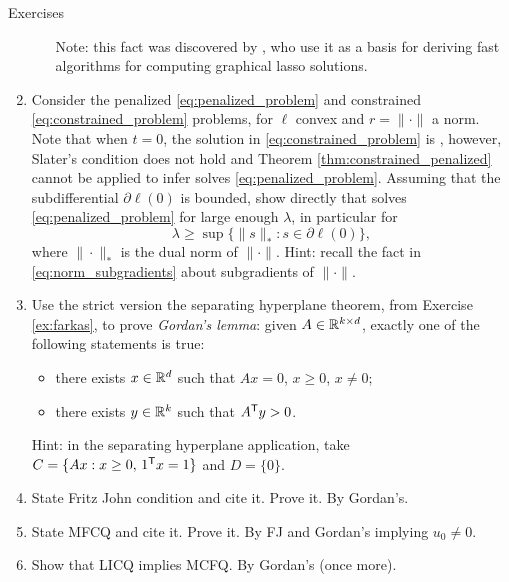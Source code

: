 \begin{xcb}{Exercises}
\begin{enumerate}[label=\thechapter.\arabic*]
\begin{enumerate}[label=\alph*.]
  \smallskip 
  Note: this fact was discovered by \cite{witten2011new, mazumder2012exact}, who
  use it as a basis for deriving fast algorithms for computing graphical lasso
  solutions.     
\end{enumerate}

\item \label{ex:penalized_limit}
  Consider the penalized \eqref{eq:penalized_problem} and constrained
  \eqref{eq:constrained_problem} problems, for $\ell$ convex and $r =
  \|\cdot\|$ a norm. Note that when $t = 0$, the solution in
  \eqref{eq:constrained_problem} is , however, Slater's
  condition does not hold and Theorem \ref{thm:constrained_penalized} cannot be
  applied to infer  solves
  \eqref{eq:penalized_problem}. Assuming that the subdifferential $\partial
  \ell(0)$ is bounded, show directly that  solves
  \eqref{eq:penalized_problem} for large enough $\lambda$, in particular for 
  \[
  \lambda \geq \sup \{ \|s\|_* : s \in \partial \ell(0) \},
  \]
  where $\|\cdot\|_*$ is the dual norm of $\|\cdot\|$. Hint: recall the fact in 
  \eqref{eq:norm_subgradients} about subgradients of $\|\cdot\|$.

\item \label{ex:gordan}
  Use the strict version the separating hyperplane theorem, from Exercise  
  \ref{ex:farkas}, to prove \emph{Gordan's lemma}: given $A \in \mathbb{R}^{k \times  
    d}$, exactly one of the following statements is true:  
  \begin{itemize}
  \item there exists $x \in \mathbb{R}^d$ such that $Ax=0$, $x \geq 0$, $x \not= 0$; 
  \item there exists $y \in \mathbb{R}^k$ such that $A^{\mathsf{T}} y > 0$.
  \end{itemize}
  Hint: in the separating hyperplane application, take $C = \{Ax : x \geq 0, \,
  1^{\mathsf{T}} x = 1 \}$ and $D = \{0\}$.   

\item \label{ex:fritz_john_condition} 
  State Fritz John condition and cite it. Prove it. By Gordan's. 

\item \label{ex:mfcq} 
  State MFCQ and cite it. Prove it. By FJ and Gordan's implying $u_0 \not=
  0$. 

\item \label{ex:licq_implies_mfcq}
  Show that LICQ implies MCFQ. By Gordan's (once more). 


\end{enumerate}
\end{xcb}
